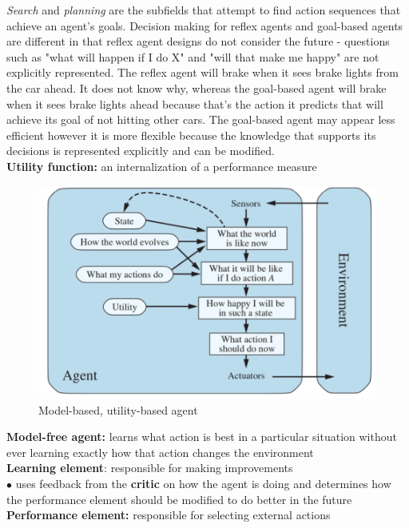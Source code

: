     \textit{Search} and \textit{planning} are the subfields that attempt to find action sequences that achieve an agent's goals. Decision making for reflex agents and goal-based agents are different in that reflex agent
    designs do not consider the future - questions such as "what will happen if I do X" and "will that make me happy" are not explicitly represented. The reflex agent will brake when it sees brake lights from the car
    ahead. It does not know why, whereas the goal-based agent will brake when it sees brake lights ahead because that's the action it predicts that will achieve its goal of not hitting other cars. The goal-based agent
    may appear less efficient however it is more flexible because the knowledge that supports its decisions is represented explicitly and can be modified. \\

    \textbf{Utility function:} an internalization of a performance measure

    \begin{figure}[hbt!]
        \centering
        \caption*{Model-based, utility-based agent}
        \includegraphics[scale = 0.75]{Assets/Model_Based_Utility_Based_Agent_Flow_Chart}
    \end{figure}

    \textbf{Model-free agent:} learns what action is best in a particular situation without ever learning exactly how that action changes the environment \\
    \textbf{Learning element}: responsible for making improvements \\
    $\bullet$ uses feedback from the \textbf{critic} on how the agent is doing and determines how the performance element should be modified to do better in the future \\
    \textbf{Performance element:} responsible for selecting external actions

